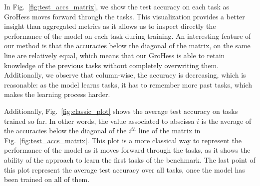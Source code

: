 \documentclass[11pt]{article}
\begin{document}
In Fig.~\ref{fig:test_accs_matrix}, we show the test accuracy on each task as GroHess moves forward through the tasks. This visualization provides a better insight than aggregated metrics as it allows us to inspect directly the performance of the model on each task during training. An interesting feature of our method is that the accuracies below the diagonal of the matrix, on the same line are relatively equal, which means that our GroHess is able to retain knowledge of the previous tasks without completely overwriting them. Additionally, we observe that column-wise, the accuracy is decreasing, which is reasonable: as the model learns tasks, it has to remember more past tasks, which makes the learning process harder.

\vspace{2mm}
\noindent
Additionally, Fig.~\ref{fig:classic_plot} shows the average test accuracy on tasks trained so far. In other words, the value associated to abscissa $i$ is the average of the accuracies below the diagonal of the $i^{th}$ line of the matrix in Fig.~\ref{fig:test_accs_matrix}. This plot is a more classical way to represent the performance of the model as it moves forward through the tasks, as it shows the ability of the approach to learn the first tasks of the benchmark. The last point of this plot represent the average test accuracy over all tasks, once the model has been trained on all of them.
\end{document}
